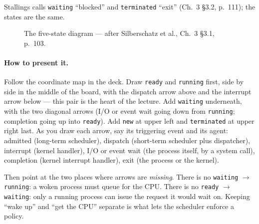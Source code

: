 \documentclass[11pt]{article}
\begin{document}
Stallings calls \texttt{waiting} ``blocked'' and \texttt{terminated} ``exit'' (Ch.~3 \S3.2, p.~111); the states are the same.

\begin{figure}[h]
\centering
{}
\caption{The five-state diagram --- after Silberschatz et al., Ch.~3 \S3.1, p.~103.}
\label{fig:h-five}
\end{figure}

\paragraph{How to present it.} Follow the coordinate map in the deck. Draw \texttt{ready} and \texttt{running} first, side by side in the middle of the board, with the dispatch arrow above and the interrupt arrow below --- this pair is the heart of the lecture. Add \texttt{waiting} underneath, with the two diagonal arrows (I/O or event wait going down from \texttt{running}; completion going up into \texttt{ready}). Add \texttt{new} at upper left and \texttt{terminated} at upper right last. As you draw each arrow, say its triggering event and its agent: admitted (long-term scheduler), dispatch (short-term scheduler plus dispatcher), interrupt (kernel handler), I/O or event wait (the process itself, by a system call), completion (kernel interrupt handler), exit (the process or the kernel).

Then point at the two places where arrows are \emph{missing}. There is no \texttt{waiting} $\to$ \texttt{running}: a woken process must queue for the CPU. There is no \texttt{ready} $\to$ \texttt{waiting}: only a running process can issue the request it would wait on. Keeping ``wake up'' and ``get the CPU'' separate is what lets the scheduler enforce a policy.
\end{document}

